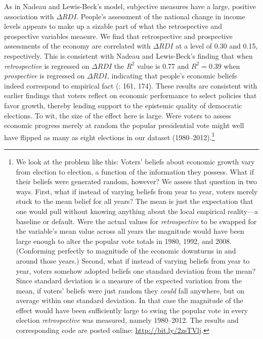 \documentclass[11pt]{article}
\begin{document}
As in Nadeau and Lewis-Beck's model, subjective measures have a large, positive association with $\Delta RDI$.
 People's assessment of the national change in income levels appears to make up a sizable part of what the retrospective and prospective variables measure.
 We find that retrospective and prospective assessments of the economy are correlated with $\Delta RDI$ at a level of 0.30 and 0.15, respectively.
  This is consistent with Nadeau and Lewis-Beck's finding that when \emph{retrospective} is regressed on $\Delta RDI$ the $R^2$ value is 0.77 and $R^2=0.39$ when \emph{prospective} is regressed on $\Delta RDI$,  indicating that people's economic beliefs indeed correspond to empirical fact (\cite{Nadeau:2001tw}: 161, 174).
These results are consistent with earlier findings that voters reflect on economic performance to select policies that favor growth, thereby lending support to the epistemic quality of democratic elections.
To wit, the size of the effect here is large. Were voters to assess economic progress merely at random the popular presidential vote might well have flipped as many as eight elections in our dataset (1980--2012).\footnote{We look at the problem like this: Voters' beliefs about economic growth vary from election to election, a function of the information they possess. What if their beliefs were generated random, however? We assess that question in two ways. First, what if instead of varying beliefs from year to year, voters merely stuck to the mean belief for all years? The mean is just the expectation that one would pull without knowing anything about the local empirical reality---a baseline or default. Were the actual values for \emph{retrospective} to be swapped for the variable's mean value across all years the magnitude would have been large enough to alter the popular vote totals in 1980, 1992, and 2008. (Conforming perfectly to magnitude of the economic downturns in and around those years.) Second, what if instead of varying beliefs from year to year, voters somehow adopted beliefs one standard deviation from the mean? Since standard deviation is a measure of the expected variation from the mean, if voters' beliefs were just random they \emph{could} fall anywhere, but on average within one standard deviation. In that case the magnitude of the effect would have been sufficiently large to swing the popular vote in every election \emph{retrospective} was measured, namely 1980--2012. The results and corresponding code are posted online: \url{http://bit.ly/2zsTVlj}.}
\end{document}
